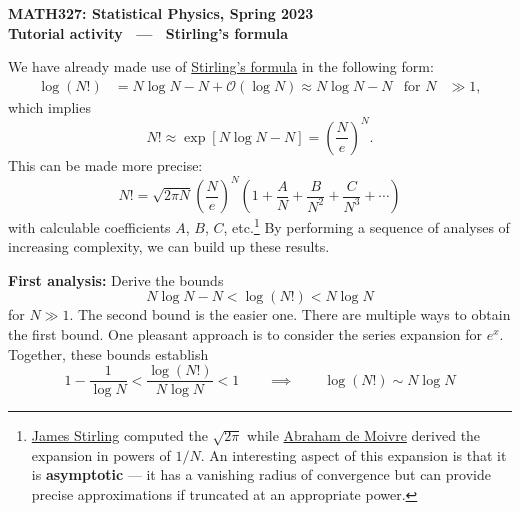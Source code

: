\documentclass[12 pt]{article} %
\newcommand{\cO}{\ensuremath{\mathcal O} }
\begin{document}
\newcommand{\thisunit}{MATH327 Tutorial (Stirling)}
\newcommand{\moddate}{Last modified 1 Mar.~2023}
\begin{center}
  {\Large \textbf{MATH327: Statistical Physics, Spring 2023}} \\[12 pt]
  {\Large \textbf{Tutorial activity \ --- \ Stirling's formula}} \\[24 pt]
\end{center}

We have already made use of \href{https://en.wikipedia.org/wiki/Stirling's_approximation}{Stirling's formula} in the following form:
\begin{align*}
  \log(N!) & = N \log N - N + \cO(\log N) \approx N \log N - N &
  \mbox{for } N & \gg 1,
\end{align*}
which implies
\begin{equation*}
  N! \approx \exp\left[N\log N - N\right] = \left(\frac{N}{e}\right)^N.
\end{equation*}
This can be made more precise:
\begin{equation}
  \label{eq:full}
  N! = \sqrt{2\pi N} \left(\frac{N}{e}\right)^N \left(1 + \frac{A}{N} + \frac{B}{N^2} + \frac{C}{N^3} + \cdots\right)
\end{equation}
with calculable coefficients $A$, $B$, $C$, etc.\footnote{\href{https://en.wikipedia.org/wiki/James_Stirling_(mathematician)}{James Stirling} computed the $\sqrt{2\pi}$ while \href{https://en.wikipedia.org/wiki/Abraham_de_Moivre}{Abraham de Moivre} derived the expansion in powers of $1 / N$.  An interesting aspect of this expansion is that it is \textbf{asymptotic} --- it has a vanishing radius of convergence but can provide precise approximations if truncated at an appropriate power.}
By performing a sequence of analyses of increasing complexity, we can build up these results.

\textbf{First analysis:} Derive the bounds
\begin{equation}
  N\log N - N < \log(N!) < N\log N
\end{equation}
for $N \gg 1$.
The second bound is the easier one.
There are multiple ways to obtain the first bound.
One pleasant approach is to consider the series expansion for $e^x$.
Together, these bounds establish
\begin{equation*}
  1 - \frac{1}{\log N} < \frac{\log(N!)}{N\log N} < 1 \qquad \implies \qquad \log(N!) \sim N\log N
\end{equation*}
\end{document}
